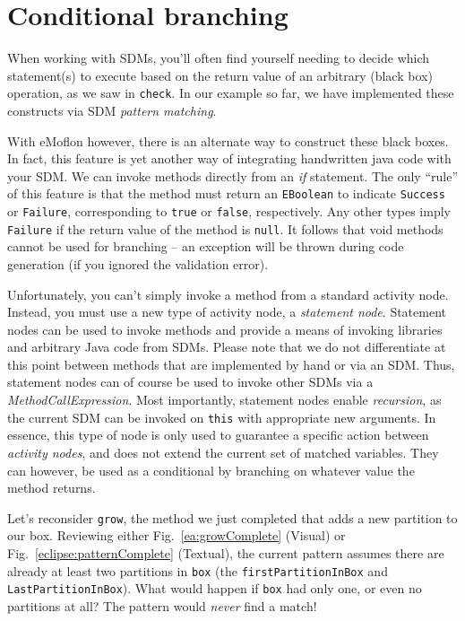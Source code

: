 \newpage
\hypertarget{sec:conBran}{}
\section{Conditional branching}
\genHeader

When working with SDMs, you'll often find yourself needing to decide which statement(s) to execute based on the return value of an arbitrary (black box)
operation, as we saw in \texttt{check}. In our example so far, we have implemented these constructs via SDM \emph{pattern matching}. 

With eMoflon however, there is an alternate way to construct these black boxes. In fact, this feature is yet another way of integrating handwritten java code
with your SDM. We can invoke methods directly from an \emph{if} statement. The only ``rule'' of this feature is that the method must return an
\texttt{EBoolean} to indicate \texttt{Success} or \texttt{Failure}, corresponding to \texttt{true} or \texttt{false}, respectively. Any other types imply
\texttt{Failure} if the return value of the method is \texttt{null}. It follows that void methods cannot be used for branching -- an exception will be thrown
during code generation (if you ignored the validation error).

Unfortunately, you can't simply invoke a method from a standard activity node. Instead, you must use a new type of activity node, a \emph{statement
node}. Statement nodes can be used to invoke methods and provide a means of invoking libraries and
arbitrary Java code from SDMs. Please note that we do not differentiate at this point between methods that are implemented by hand or via an SDM. Thus,
statement nodes can of course be used to invoke other SDMs via a \emph{MethodCallExpression}. Most importantly, statement nodes enable \emph{recursion}, as the
current SDM can be invoked on \texttt{this} with appropriate new arguments. In essence, this type of node is only used to guarantee a specific action
between \emph{activity nodes}, and does not extend the current set of matched variables. They can however, be used as a conditional by branching on
whatever value the method returns.

Let's reconsider \texttt{grow}, the method we just completed that adds a new partition to our box. Reviewing either Fig.~\ref{ea:growComplete} (Visual) or
Fig.~\ref{eclipse:patternComplete} (Textual), the current pattern assumes there are already at least two partitions in \texttt{box} (the
\texttt{firstPartitionInBox} and \texttt{LastPartitionInBox}). What would happen if \texttt{box} had only one, or even no partitions at all? The pattern would
\emph{never} find a match!

